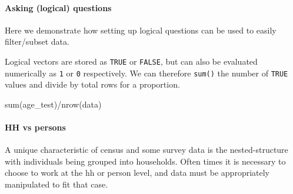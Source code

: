 \documentclass[
]{book}
\newenvironment{Shaded}{\begin{snugshade}}{\end{snugshade}}
\newcommand{\DecValTok}[1]{\textcolor[rgb]{0.00,0.00,0.81}{#1}}
\newcommand{\FunctionTok}[1]{\textcolor[rgb]{0.00,0.00,0.00}{#1}}
\newcommand{\NormalTok}[1]{#1}
\newcommand{\OtherTok}[1]{\textcolor[rgb]{0.56,0.35,0.01}{#1}}
\newcommand{\SpecialCharTok}[1]{\textcolor[rgb]{0.00,0.00,0.00}{#1}}
\begin{document}
\hypertarget{asking-logical-questions}{%
\paragraph*{Asking (logical) questions}\label{asking-logical-questions}}

Here we demonstrate how setting up logical questions can be used to easily filter/subset data.

\begin{Shaded}
\end{Shaded}

Logical vectors are stored as \texttt{TRUE} or \texttt{FALSE}, but can also be evaluated numerically as \texttt{1} or \texttt{0} respectively. We can therefore \texttt{sum()} the number of \texttt{TRUE} values and divide by total rows for a proportion.

\begin{Shaded}
\begin{Highlighting}[]
\FunctionTok{sum}\NormalTok{(age\_test)}\SpecialCharTok{/}\FunctionTok{nrow}\NormalTok{(data)}
\end{Highlighting}
\end{Shaded}

\hypertarget{hh-vs-persons}{%
\paragraph*{HH vs persons}\label{hh-vs-persons}}

A unique characteristic of census and some survey data is the nested-structure with individuals being grouped into households. Often times it is necessary to choose to work at the hh or person level, and data must be appropriately manipulated to fit that case.

\begin{Shaded}
\end{Shaded}
\end{document}
